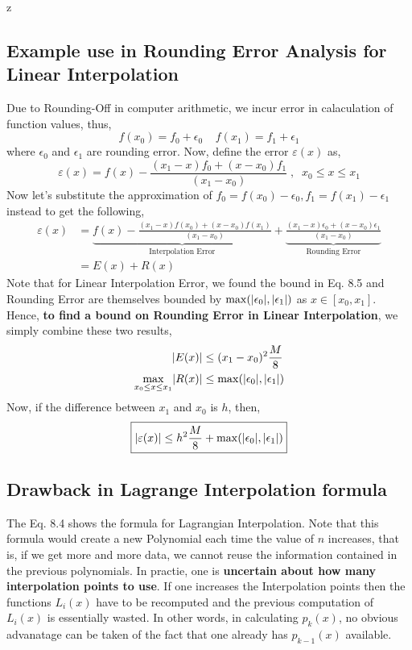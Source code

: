 z\documentclass[a4paper,12pt,twoside]{book}
\newcommand{\nll}[0]{\newline\newline}
\DeclarePairedDelimiter\abs{\lvert}{\rvert}
\begin{document}
\subsection{Example use in Rounding Error Analysis for Linear Interpolation}
Due to Rounding-Off in computer arithmetic, we incur error in calaculation of function values, thus,
\[f(x_0) = f_0 + \epsilon_0 \;\;\;\; f(x_1) = f_1 + \epsilon_1\]
where $\epsilon_0$ and $\epsilon_1$ are rounding error.
\nll
Now, define the error $\varepsilon(x)$ as,
\[\varepsilon(x) = f(x) - \frac{(x_1 - x)f_0 + (x - x_0)f_1}{(x_1 - x_0)}\;,\;\;x_0\le x \le x_1\]
Now let's substitute the approximation of $f_0 = f(x_0) - \epsilon_0, f_1 = f(x_1) - \epsilon_1$ instead to get the following,
\begin{equation}
    \begin{split}
        \varepsilon(x) &= \underbrace{f(x) - \frac{(x_1 - x)f(x_0) + (x - x_0)f(x_1)}{(x_1 - x_0)}}_{\text{Interpolation Error}} + \underbrace{\frac{(x_1 - x)\epsilon_0 + (x - x_0)\epsilon_1}{(x_1 - x_0)}}_{\text{Rounding Error}}\\
        &= E(x) + R(x)
    \end{split}
\end{equation}
Note that for Linear Interpolation Error, we found the bound in Eq. 8.5 and Rounding Error are themselves bounded by $\max(\abs{\epsilon_0} , \abs{\epsilon_1})$ as $x\in[x_0,x_1]$. Hence, \textbf{to find a bound on Rounding Error in Linear Interpolation}, we simply combine these two results,
\begin{equation}
    \begin{split}
       \abs*{E(x)} &\le (x_1-x_0)^2\frac{M}{8}\\
       \underset{x_0\le x\le x_1}{\max} \abs*{R(x)} &\le \max (\abs{\epsilon_0}, \abs{\epsilon_1})
    \end{split}
\end{equation}
Now, if the difference between $x_1$ and $x_0$ is $h$, then,
\begin{equation}
    \boxed{\abs{\varepsilon(x)}\le h^2 \frac{M}{8} + \max(\abs{\epsilon_0}, \abs{\epsilon_1})} 
\end{equation}
\subsection{Drawback in Lagrange Interpolation formula}
The Eq. 8.4 shows the formula for Lagrangian Interpolation. Note that this formula would create a new Polynomial each time the value of $n$ increases, that is, if we get more and more data, we cannot reuse the information contained in the previous polynomials.
\nll
In practie, one is \textbf{uncertain about how many interpolation points to use}. If one increases the Interpolation points then the functions $L_i(x)$ have to be recomputed and the previous computation of $L_i(x)$ is essentially wasted. In other words, in calculating $p_k(x)$, no obvious advanatage can be taken of the fact that one already has $p_{k-1}(x)$ available. 
\end{document}
